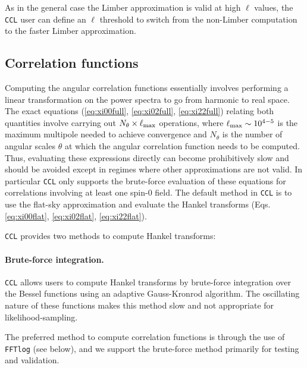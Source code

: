 \documentclass[\docopts]{\docclass}
\newcommand{\ccl}{{\tt CCL}\xspace}
\begin{document}
As in the general case the Limber approximation is valid at high $\ell$ values, the \ccl user can define an $\ell$ threshold to switch from the non-Limber computation to the faster Limber approximation.
 


\subsection{Correlation functions}

Computing the angular correlation functions essentially involves performing a linear transformation on the power spectra to go from harmonic to real space. The exact equations (\ref{eq:xi00full}, \ref{eq:xi02full}, \ref{eq:xi22full}) relating both quantities involve carrying out $N_\theta\times\ell_{\rm max}$ operations, where $\ell_{\rm max}\sim 10^{4-5}$ is the maximum multipole needed to achieve convergence and $N_\theta$ is the number of angular scales $\theta$ at which the angular correlation function needs to be computed. Thus, evaluating these expressions directly can become prohibitively slow and should be avoided except in regimes where other approximations are not valid. In particular \ccl only supports the brute-force evaluation of these equations for correlations involving at least one spin-0 field. The default method in \ccl is to use the flat-sky approximation and evaluate the Hankel transforms (Eqs. \ref{eq:xi00flat}, \ref{eq:xi02flat}, \ref{eq:xi22flat}).

\ccl provides two methods to compute Hankel transforms:

\paragraph{\bf Brute-force integration.} \ccl allows users to compute Hankel transforms by brute-force integration over the Bessel functions using an adaptive Gauss-Kronrod algorithm. The oscillating nature of these functions makes this method slow and not appropriate for likelihood-sampling.

The preferred method to compute correlation functions is through the use of {\tt FFTlog} (see below), and we support the brute-force method primarily for testing and validation.
\end{document}

